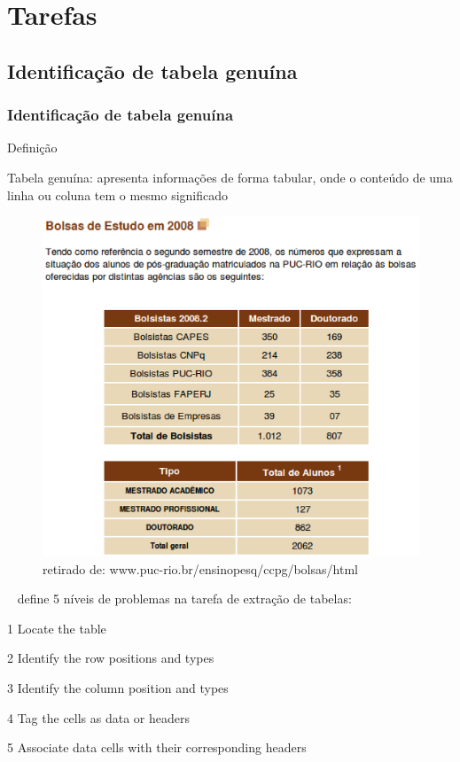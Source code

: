 \documentclass{beamer}
\newenvironment{my_itemize}{
\begin{itemize}
  \setlength{\itemsep}{5pt}
  \setlength{\parskip}{2pt}
  \setlength{\parsep}{3pt}
}{\end{itemize}}
\begin{document}
\section{Tarefas}
\begin{frame}[allowframebreaks]
  \subsection{Identificação de tabela genuína}
  \frametitle{Identificação de tabela genuína}
  \begin{my_itemize}
    \item Definição
    \begin{my_itemize}
    \item Tabela genuína: apresenta informações de forma tabular, onde o conteúdo de uma linha ou coluna tem o mesmo significado
    \end{my_itemize}

\begin{figure}[h]
    \center
    \includegraphics[scale=0.25]{img/table}
    \caption{retirado de: www.puc-rio.br/ensinopesq/ccpg/bolsas/html}
\end{figure}

\newpage
    \item ~\cite{Pinto2003} define 5 níveis de problemas na tarefa de extração de tabelas:
    \begin{my_itemize}
    \item[1] \alert{Locate the table}
    \item[2] Identify the row positions and types
    \item[3] Identify the column position and types
    \item[4] Tag the cells as data or headers
    \item[5] Associate data cells with their corresponding headers
    \end{my_itemize}


\end{my_itemize}
\end{frame}
\end{document}
